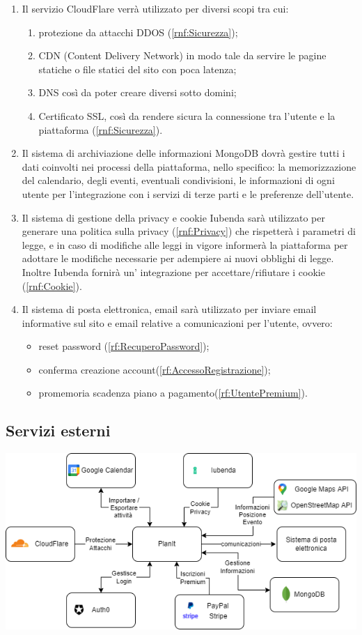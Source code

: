 \begin{enumerate}
    \item Il servizio CloudFlare verrà utilizzato per diversi scopi tra cui:
          \begin{enumerate}
              \item protezione da attacchi DDOS (\ref{rnf:Sicurezza});
              \item CDN (Content Delivery Network) in modo tale da servire le pagine statiche o file statici del sito con poca latenza;
              \item DNS così da poter creare diversi sotto domini;
              \item Certificato SSL, così da rendere sicura la connessione tra l'utente e la piattaforma (\ref{rnf:Sicurezza}).
          \end{enumerate}

    \item Il sistema di archiviazione delle informazioni MongoDB dovrà gestire tutti i dati coinvolti nei processi della piattaforma, nello specifico: la memorizzazione del calendario, degli eventi, eventuali condivisioni, le informazioni di ogni utente per l'integrazione con i servizi di terze parti e le preferenze dell'utente.

    \item Il sistema di gestione della privacy e cookie Iubenda sarà utilizzato per generare una politica sulla privacy (\ref{rnf:Privacy}) che rispetterà i parametri di legge, e in caso di modifiche alle leggi in vigore informerà la piattaforma per adottare le modifiche necessarie per adempiere ai nuovi obblighi di legge. Inoltre Iubenda fornirà un' integrazione per accettare/rifiutare i cookie (\ref{rnf:Cookie}).

    \item Il sistema di posta elettronica, email sarà utilizzato per inviare email informative sul sito e email relative a comunicazioni per l'utente, ovvero:
          \begin{itemize}
              \item reset password (\ref{rf:RecuperoPassword});
              \item conferma creazione account(\ref{rf:AccessoRegistrazione});
              \item promemoria scadenza piano a pagamento(\ref{rf:UtentePremium}).
          \end{itemize}
\end{enumerate}

\subsection*{Servizi esterni}
\begin{center}
    \includegraphics[width=1\textwidth]{img/Servizi/Servizi esterni.drawio.png}
\end{center}